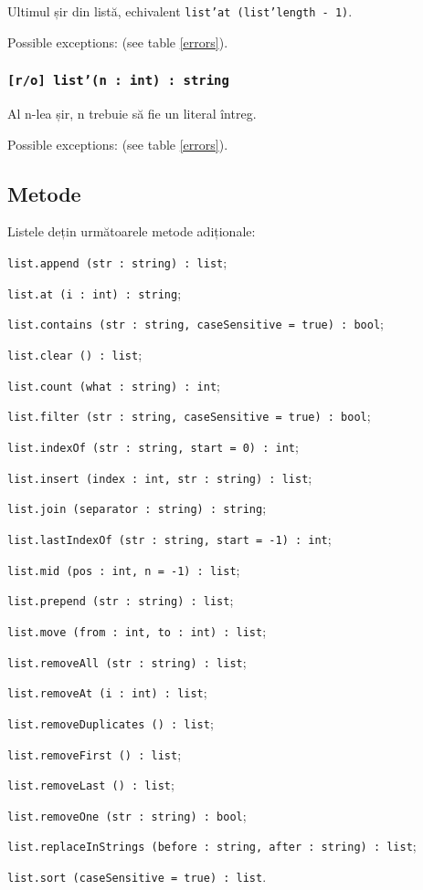 Ultimul șir din listă, echivalent \texttt{list'at (list'length - 1)}.

Possible exceptions:  (see table \ref{errors}).

\subsubsection{\texttt{[r/o] list'(n : int) : string}}

Al n-lea șir, n trebuie să fie un literal întreg.

Possible exceptions:  (see table \ref{errors}).

\subsection{Metode}

Listele dețin următoarele metode adiționale:
\begin{icItems}
\item \texttt{list.append (str : string) : list};
\item \texttt{list.at (i : int) : string};
\item \texttt{list.contains (str : string, caseSensitive = true) : bool};
\item \texttt{list.clear () : list};
\item \texttt{list.count (what : string) : int};
\item \texttt{list.filter (str : string, caseSensitive = true) : bool};
\item \texttt{list.indexOf (str : string, start = 0) : int};
\item \texttt{list.insert (index : int, str : string) : list};
\item \texttt{list.join (separator : string) : string};
\item \texttt{list.lastIndexOf (str : string, start = -1) : int};
\item \texttt{list.mid (pos : int, n = -1) : list};
\item \texttt{list.prepend (str : string) : list};
\item \texttt{list.move (from : int, to : int) : list};
\item \texttt{list.removeAll (str : string) : list};
\item \texttt{list.removeAt (i : int) : list};
\item \texttt{list.removeDuplicates () : list};
\item \texttt{list.removeFirst () : list};
\item \texttt{list.removeLast () : list};
\item \texttt{list.removeOne (str : string) : bool};
\item \texttt{list.replaceInStrings (before : string, after : string) : list};
\item \texttt{list.sort (caseSensitive = true) : list}.
\end{icItems}

